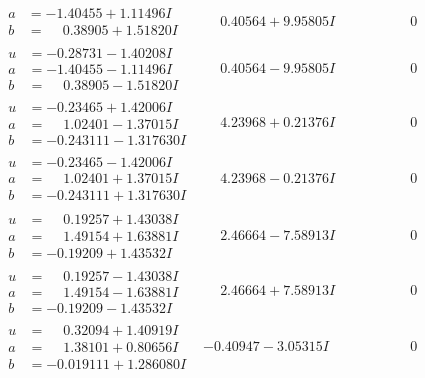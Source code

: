 \documentclass[1p]{elsarticle_modified}
\theoremstyle{definition}
\begin{document}
$$\begin{array}{c|c|c}
\begin{aligned}
a &= -1.40455 + 1.11496 I \\
b &= \phantom{-}0.38905 + 1.51820 I\end{aligned}
 & \phantom{-}0.40564 + 9.95805 I & \phantom{-0.000000 } 0 \\ \hline\begin{aligned}
u &= -0.28731 - 1.40208 I \\
a &= -1.40455 - 1.11496 I \\
b &= \phantom{-}0.38905 - 1.51820 I\end{aligned}
 & \phantom{-}0.40564 - 9.95805 I & \phantom{-0.000000 } 0 \\ \hline\begin{aligned}
u &= -0.23465 + 1.42006 I \\
a &= \phantom{-}1.02401 - 1.37015 I \\
b &= -0.243111 - 1.317630 I\end{aligned}
 & \phantom{-}4.23968 + 0.21376 I & \phantom{-0.000000 } 0 \\ \hline\begin{aligned}
u &= -0.23465 - 1.42006 I \\
a &= \phantom{-}1.02401 + 1.37015 I \\
b &= -0.243111 + 1.317630 I\end{aligned}
 & \phantom{-}4.23968 - 0.21376 I & \phantom{-0.000000 } 0 \\ \hline\begin{aligned}
u &= \phantom{-}0.19257 + 1.43038 I \\
a &= \phantom{-}1.49154 + 1.63881 I \\
b &= -0.19209 + 1.43532 I\end{aligned}
 & \phantom{-}2.46664 - 7.58913 I & \phantom{-0.000000 } 0 \\ \hline\begin{aligned}
u &= \phantom{-}0.19257 - 1.43038 I \\
a &= \phantom{-}1.49154 - 1.63881 I \\
b &= -0.19209 - 1.43532 I\end{aligned}
 & \phantom{-}2.46664 + 7.58913 I & \phantom{-0.000000 } 0 \\ \hline\begin{aligned}
u &= \phantom{-}0.32094 + 1.40919 I \\
a &= \phantom{-}1.38101 + 0.80656 I \\
b &= -0.019111 + 1.286080 I\end{aligned}
 & -0.40947 - 3.05315 I & \phantom{-0.000000 } 0 \\ \hline\begin{aligned}

\end{aligned}
\end{array}$$
\end{document}
